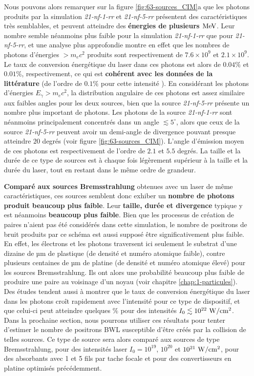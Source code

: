 \begin{refsection}
Nous pouvons alors remarquer sur la figure \ref{fig:63-sources_CIM}a que les photons produits par la simulation \textit{21-nf-1-rr} et \textit{21-nf-5-rr} présentent des caractéristiques très semblables, et peuvent atteindre des \textbf{énergies de plusieurs $\rm MeV$}. Leur nombre semble néanmoins plus faible pour la simulation \textit{21-nf-1-rr} que pour \textit{21-nf-5-rr}, et une analyse plus approfondie montre en effet que les nombres de photons d'énergies $>m_e c^2$ produits sont respectivement de $7.6 \times 10^9$ et $2.1 \times 10^9$. Le taux de conversion énergétique du laser dans ces photons est alors de $0.04\%$ et $0.01\%$, respectivement, ce qui est \textbf{cohérent avec les données de la littérature} (de l'ordre de $0.1 \%$ pour cette intensité \parencite{huang_2018, huang_2019}). En considérant les photons d'énergies $E_\gamma>m_ec^2$, la distribution angulaire de ces photons est assez similaire aux faibles angles pour les deux sources, bien que la source \textit{21-nf-5-rr} présente un nombre plus important de photons. Les photons de la source \textit{21-nf-1-rr} sont néanmoins principalement concentrés dans un angle $\lesssim 5^\circ$, alors que ceux de la source \textit{21-nf-5-rr} peuvent avoir un demi-angle de divergence pouvant presque atteindre $20$ degrés (voir figure \ref{fig:63-sources_CIM}). L'angle d'émission moyen de ces photons est respectivement de l'ordre de $2.1$ et $5.5$ degrés. La taille et la durée de ce type de sources est à chaque fois légèrement supérieur à la taille et la durée du laser, tout en restant dans le même ordre de grandeur. 

\textbf{Comparé aux sources Bremsstrahlung} obtenues avec un laser de même caractéristiques, ces sources semblent donc exhiber un \textbf{nombre de photons produit beaucoup plus faible}. Leur \textbf{taille, durée et divergence} typique y est néanmoins \textbf{beaucoup plus faible}. Bien que les processus de création de paires n'aient pas été considérés dans cette simulation, le nombre de positrons de bruit produits par ce schéma est aussi supposé être significativement plus faible. En effet, les électrons et les photons traversent ici seulement le substrat d'une dizaine de µm de plastique (de densité et numéro atomique faible), contre plusieurs centaines de µm de platine (de densité et numéro atomique élevé) pour les sources Bremsstrahlung. Ils ont alors une probabilité beaucoup plus faible de produire une paire au voisinage d'un noyau (voir chapitre \ref{chap:1-particules}). Des études \parencite{huang_2018, huang_2019} tendent aussi à montrer que le taux de conversion énergétique du laser dans les photons croît rapidement avec l'intensité pour ce type de dispositif, et que celui-ci peut atteindre quelques $\%$ pour des intensités $I_0 \lesssim 10^{22} ~ \rm W/cm^2$.
Dans la prochaine section, nous pourrons utiliser ces résultats pour tenter d'estimer le nombre de positrons BWL susceptible d'être créés par la collision de telles sources. Ce type de source sera alors comparé aux sources de type Bremsstrahlung, pour des intensités laser $I_0=10^{19}$, $10^{20}$ et $10^{21} ~ \rm W/cm^2$, pour des absorbants avec 1 et 5 fils par tache focale et pour des convertisseurs en platine optimisés précédemment. 


\end{refsection}
